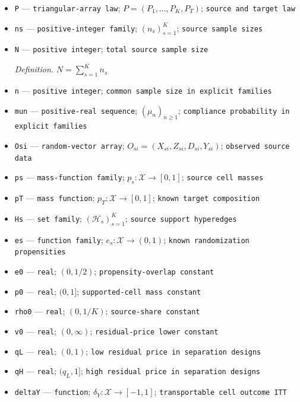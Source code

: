 \documentclass{article}
\begin{document}
\begin{itemize}
  \item \texttt{P} --- \texttt{triangular-\allowbreak{}array law}; \(P=(P_1,\ldots,P_K,P_T)\); \texttt{source and target law}
  \item \texttt{ns} --- \texttt{positive-\allowbreak{}integer family}; \((n_s)_{s=1}^K\); \texttt{source sample sizes}
  \item \texttt{N} --- \texttt{positive integer}; \texttt{total source sample size}
  \par\smallskip\noindent\emph{Definition.} \(N=\sum_{s=1}^K n_s\)
  \item \texttt{n} --- \texttt{positive integer}; \texttt{common sample size in explicit families}
  \item \texttt{mun} --- \texttt{positive-\allowbreak{}real sequence}; \((\mu_n)_{n\ge1}\); \texttt{compliance probability in explicit families}
  \item \texttt{Osi} --- \texttt{random-\allowbreak{}vector array}; \(O_{si}=(X_{si},Z_{si},D_{si},Y_{si})\); \texttt{observed source data}
  \item \texttt{ps} --- \texttt{mass-\allowbreak{}function family}; \(p_s:\mathcal X\to[0,1]\); \texttt{source cell masses}
  \item \texttt{pT} --- \texttt{mass function}; \(p_T:\mathcal X\to[0,1]\); \texttt{known target composition}
  \item \texttt{Hs} --- \texttt{set family}; \((\mathcal H_s)_{s=1}^K\); \texttt{source support hyperedges}
  \item \texttt{es} --- \texttt{function family}; \(e_s:\mathcal X\to(0,1)\); \texttt{known randomization propensities}
  \item \texttt{e0} --- \texttt{real}; \((0,1/2)\); \texttt{propensity-\allowbreak{}overlap constant}
  \item \texttt{p0} --- \texttt{real}; \((0,1]\); \texttt{supported-\allowbreak{}cell mass constant}
  \item \texttt{rho0} --- \texttt{real}; \((0,1/K)\); \texttt{source-\allowbreak{}share constant}
  \item \texttt{v0} --- \texttt{real}; \((0,\infty)\); \texttt{residual-\allowbreak{}price lower constant}
  \item \texttt{qL} --- \texttt{real}; \((0,1)\); \texttt{low residual price in separation designs}
  \item \texttt{qH} --- \texttt{real}; \((q_L,1]\); \texttt{high residual price in separation designs}
  \item \texttt{deltaY} --- \texttt{function}; \(\delta_Y:\mathcal X\to[-1,1]\); \texttt{transportable cell outcome ITT}

\end{itemize}
\end{document}
